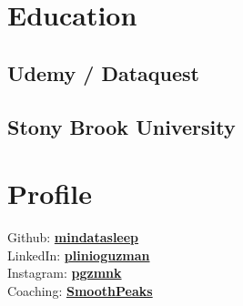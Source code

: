 \documentclass[letterpaper]{deedy-resume} %
\begin{document}




\begin{minipage}[t]{0.33\textwidth} %


\section{Education} 

\subsection{Udemy / Dataquest}

\sectionspace %

\subsection{Stony Brook University}

\sectionspace %


\section{Profile} 

Github: \href{https://github.com/mindatasleep}{\bf mindatasleep} \\
LinkedIn: \href{https://www.linkedin.com/in/plinioguzman/}{\bf plinioguzman} \\
Instagram: \href{https://instagram.com/pgzmnk/}{\bf pgzmnk} \\
Coaching: \href{http://smoothpeaks.surge.sh/}{\bf SmoothPeaks} \\



\end{minipage}
\end{document}
